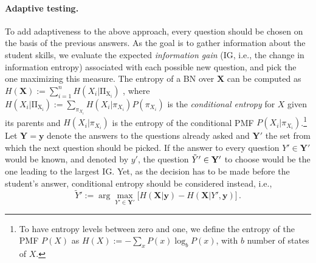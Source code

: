 \documentclass[runningheads]{llncs}
\begin{document}
	\paragraph{Adaptive testing.} To add adaptiveness to the above approach, every 
	question should be chosen on the basis of the previous answers. As the goal is to 
	gather information about the student skills, we evaluate the expected 
	\emph{information gain} (IG, i.e., the change in information entropy) associated with 
	each possible new question, and pick the one maximizing this measure. The entropy of 
	a BN over $\bm{X}$ can be computed as $H(\bm{X}):=\sum_{i=1}^n 
	H(X_i|\mathrm{\Pi_{X_i}})$ \cite{koller2009}, where 
	$H(X_i|\mathrm{\Pi_{X_i}}):=\sum_{\pi_{X_i}} H(X_i|\pi_{X_i}) P(\pi_{X_i})$ is the 
	\emph{conditional entropy} for $X$ given its parents and $H(X_i|\pi_{X_i})$ is the 
	entropy of the conditional PMF $P(X_i|\pi_{X_i})$.\footnote{To have entropy levels 
	between zero and one, we define the entropy of the PMF $P(X)$ as $H(X):=-\sum_x 
	P(x) \log_b P(x)$, with $b$ number of states of $X$.} Let $\bm{Y}=\bm{y}$ denote the 
	answers to the questions already asked and $\bm{Y}'$ the set from which the next 
	question should be picked. If the answer to every question $Y'\in\bm{Y}'$ would be 
	known, and denoted by $y'$, the question $\tilde{Y}' \in \bf{\mathbf{Y}'}$ to choose 
	would be the one leading to the largest IG. Yet, as the decision has to be made before 
	the student's answer, conditional entropy should be considered instead, i.e.,
	\begin{equation}
		\tilde{Y}' := \arg \max_{Y'\in \bm{Y}'} 
		\bigl[H(\bm{X}|\bm{y})-H(\bm{X}|Y',\bm{y})\bigr]\,. 
		\label{eq:expent}
	\end{equation}
	
\end{document}
